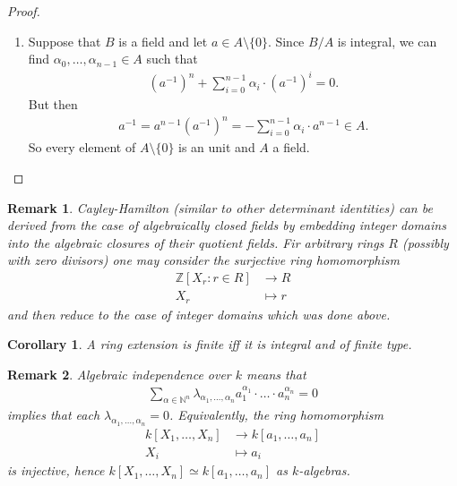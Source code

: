 \documentclass[DIV=14,parskip=full,pointednumbers]{scrartcl}
\newenvironment{rmnumerate}{\begin{enumerate}[label={\upshape(\roman*)}]}{\end{enumerate}}
\theoremstyle{cthm}
\newtheorem{cor}{Corollary}[subsection]
\theoremstyle{cdef}
\newtheorem{rem}{Remark}[subsection]
\newcommand{\IN}{\mathbb{N}}
\newcommand{\IZ}{\mathbb{Z}}
\newcommand{\longto}{\longrightarrow}
\newcommand{\ldotspam}{,\ldots,}
\begin{document}
\begin{proof}
\begin{rmnumerate}
  \item Suppose that $B$ is a field and let $a\in A \setminus\{0\}$. Since $B/A$ is integral, we can find $\alpha_0\ldotspam \alpha_{n-1}\in A$ such that 
\begin{align*}
 \left(a^{-1}\right)^n+\sum_{i=0}^{n-1}\alpha_i\cdot\left(a^{-1}\right)^i = 0.
\end{align*}
But then 
\begin{align*}
 a^{-1} = a^{n-1}\left(a^{-1}\right)^n = -\sum_{i=0}^{n-1} \alpha_i\cdot a^{n-1} \in A.
 \end{align*}
So every element of $A\setminus\{0\}$ is an unit and $A$ a field.
 \end{rmnumerate}
 

\end{proof}
\begin{rem}
 Cayley-Hamilton (similar to other determinant identities) can be derived from the case of algebraically closed fields by embedding integer domains into the algebraic closures of their quotient fields. Fir arbitrary rings $R$ (possibly with zero divisors) one may consider the surjective ring homomorphism
 \begin{align*}
  \IZ[X_r: r\in R] &\longto R\\
  X_r &\longmapsto r
 \end{align*}
 and then reduce to the case of integer domains which was done above.

\end{rem}

\begin{cor}
 A ring extension is finite iff it is integral and of finite type.
\end{cor}
\begin{rem}
 Algebraic independence over $k$ means that
 \begin{align*}
  \sum_{\alpha\in \IN^n} \lambda_{\alpha_1\ldotspam \alpha_n} a_1^{\alpha_1}\cdot\ldots\cdot a_n^{\alpha_n}=0
 \end{align*}
implies that each $\lambda_{\alpha_1\ldotspam \alpha_n}=0$. Equivalently, the ring homomorphism 
\begin{align*}
 k[X_1,\ldots, X_n]&\longto k[a_1,\ldots, a_n]\\
 X_i&\longmapsto a_i
\end{align*}
is injective, hence $k[X_1,\ldots, X_n]\simeq k[a_1,\ldots, a_n]$ as $k$-algebras.
\end{rem}
\end{document}

